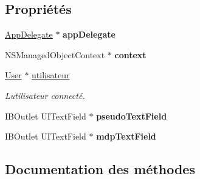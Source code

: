 \subsection*{Propriétés}
\begin{DoxyCompactItemize}
\item 
\hypertarget{interface_connexion_view_controller_a1e2c82fffa7324ab73d95ccbae73bc0d}{}\hyperlink{interface_app_delegate}{App\+Delegate} $\ast$ {\bfseries app\+Delegate}\label{interface_connexion_view_controller_a1e2c82fffa7324ab73d95ccbae73bc0d}

\item 
\hypertarget{interface_connexion_view_controller_ad5880b44dc1a9020f841342e12a8a4b8}{}N\+S\+Managed\+Object\+Context $\ast$ {\bfseries context}\label{interface_connexion_view_controller_ad5880b44dc1a9020f841342e12a8a4b8}

\item 
\hypertarget{interface_connexion_view_controller_a4e9f74acbcfacffdbbe07e6224fc3ee5}{}\hyperlink{interface_user}{User} $\ast$ \hyperlink{interface_connexion_view_controller_a4e9f74acbcfacffdbbe07e6224fc3ee5}{utilisateur}\label{interface_connexion_view_controller_a4e9f74acbcfacffdbbe07e6224fc3ee5}

\begin{DoxyCompactList}\small\item\em L\textquotesingle{}utilisateur connecté. \end{DoxyCompactList}\item 
\hypertarget{interface_connexion_view_controller_ab0eccdebd709ed8bee199d1fabda52d2}{}I\+B\+Outlet U\+I\+Text\+Field $\ast$ {\bfseries pseudo\+Text\+Field}\label{interface_connexion_view_controller_ab0eccdebd709ed8bee199d1fabda52d2}

\item 
\hypertarget{interface_connexion_view_controller_ab5e7ecb25cf4c4930df947f5b88db1da}{}I\+B\+Outlet U\+I\+Text\+Field $\ast$ {\bfseries mdp\+Text\+Field}\label{interface_connexion_view_controller_ab5e7ecb25cf4c4930df947f5b88db1da}

\end{DoxyCompactItemize}


\subsection{Documentation des méthodes}
\hypertarget{interface_connexion_view_controller_a32b03e9bd1681e7fe79d34ade1ae81b0}{}
